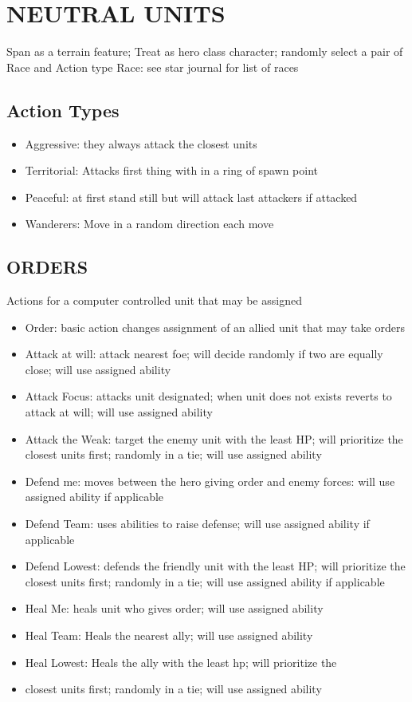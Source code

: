 \section{NEUTRAL UNITS}
Span as a terrain feature; Treat as hero class character; randomly select a pair of Race and Action type
Race: see star journal for list of races

\subsection{Action Types}
\begin{itemize}
\item Aggressive: they always attack the closest units
\item Territorial: Attacks first thing with in a ring of spawn point
\item Peaceful: at first stand still but will attack last attackers if attacked
\item Wanderers: Move in a random direction each move
\end{itemize}

\subsection{ORDERS}
Actions for a computer controlled unit that may be assigned
\begin{itemize}
\item Order: basic action changes assignment of an allied unit that may take orders
\item Attack at will: attack nearest foe; will decide randomly if two are equally close; will use assigned ability
\item Attack Focus: attacks unit designated; when unit does not exists reverts to attack at will; will use assigned ability
\item Attack the Weak: target the enemy unit with the least HP; will prioritize the closest units first; randomly in a tie; will use assigned ability
\item Defend me: moves between the hero giving order and enemy forces: will use assigned ability if applicable
\item Defend Team: uses abilities to raise defense; will use assigned ability if applicable
\item Defend Lowest:  defends the friendly unit with the least HP; will prioritize the closest units first; randomly in a tie; will use assigned ability if applicable
\item Heal Me: heals unit who gives order; will use assigned ability 
\item Heal Team: Heals the nearest ally; will use assigned ability
\item Heal Lowest: Heals the ally with the least hp; will prioritize the \item closest units first; randomly in a tie; will use assigned ability
\end{itemize}

